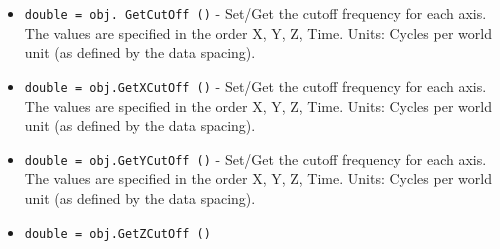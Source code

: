 \begin{itemize}
\item  \verb|double = obj. GetCutOff ()| -  Set/Get the cutoff frequency for each axis.
 The values are specified in the order X, Y, Z, Time.
 Units: Cycles per world unit (as defined by the data spacing).

\item  \verb|double = obj.GetXCutOff ()| -  Set/Get the cutoff frequency for each axis.
 The values are specified in the order X, Y, Z, Time.
 Units: Cycles per world unit (as defined by the data spacing).

\item  \verb|double = obj.GetYCutOff ()| -  Set/Get the cutoff frequency for each axis.
 The values are specified in the order X, Y, Z, Time.
 Units: Cycles per world unit (as defined by the data spacing).

\item  \verb|double = obj.GetZCutOff ()|

\end{itemize}
